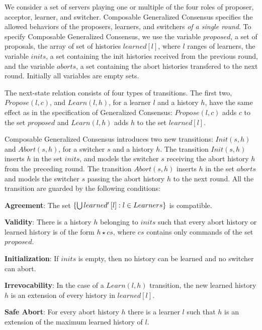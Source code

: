 We consider a set of servers playing one or multiple of the four roles of proposer, acceptor, learner, and switcher. 
Composable Generalized Consensus specifies the allowed behaviors of the proposers, learners, and switchers
\emph{of a single round}. 
To specify Composable Generalized Consensus, we use the variable $proposed$, a set of proposals, the array of set of histories $learned\left[ l \right]$, where $l$ ranges of learners, the variable $inits$, a set containing the init histories received from the previous
round, and the variable $aborts$, a set containing the abort histories transfered to the next round.
Initially all variables are empty sets.

The next-state relation
consists of four types of transitions. The first two, $Propose\left( l, c \right)$, and $Learn\left( l, h \right)$, for a learner $l$ and a
history $h$, have the same effect as in the specification of Generalized Consensus: 
$Propose\left( l,c \right)$ adds $c$ to the set $proposed$ and $Learn\left( l,h \right)$ adds $h$ to the set $learned\left[ l \right]$.

Composable Generalized Consensus introduces two new transitions: $Init\left( s, h \right)$ and $Abort\left( s, h
\right)$, for a switcher $s$ and a history $h$. The transition $Init\left( s,h \right)$ inserts $h$ in the set $inits$, and models the switcher $s$ receiving
the abort history $h$ from the preceding round. The transition $Abort\left( s, h \right)$ inserts $h$ in the set $aborts$ and models the switcher $s$ passing the abort history $h$ to the next round.  
All the transition are guarded by the following conditions:
\begin{compactitem}
    \item[\textbf{Agreement}:] The set $\left\{\bigcup learned'\left[ l
      \right] : l \in Learners\right\}$ is compatible.
    \item[\textbf{Validity}:] There is a history $h$ belonging to $inits$ such that every abort history or learned history 
        is of the form $h \star cs$, where $cs$ contains only commands
        of the set $proposed$.
    \item[\textbf{Initialization}:] If $inits$ is empty, then no
        history can be learned and no switcher can abort.
    \item[\textbf{Irrevocability}:] In the case of a $Learn\left( l,h
        \right)$ transition, the new learned history $h$ is an 
        extension of every history in $learned\left[ l \right]$.
    \item[\textbf{Safe Abort}:] For every abort history $h$ there is a learner $l$ such that $h$ is an extension of the maximum learned history of $l$.
\end{compactitem}

